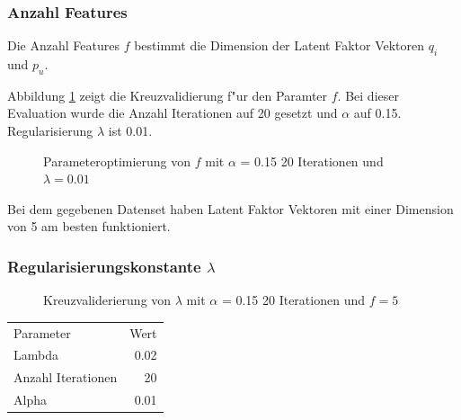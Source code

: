 \documentclass[a4paper, 12pt]{article}
\begin{document}
\subsubsection{Anzahl Features}

Die Anzahl Features $f$ bestimmt die Dimension der Latent Faktor Vektoren $q_i$ und $p_u$.

Abbildung \ref{fig:lambda1} zeigt die Kreuzvalidierung f"ur den Paramter $f$. Bei dieser Evaluation wurde die Anzahl Iterationen auf 20 gesetzt und $\alpha$ auf 0.15. Regularisierung $\lambda$ ist 0.01.

\begin{figure}
  \centering
{}
\label{fig:lambda1}
\caption{Parameteroptimierung von $f$ mit $\alpha$ = 0.15 20 Iterationen und $\lambda=0.01$}
\end{figure}

Bei dem gegebenen Datenset haben Latent Faktor Vektoren mit einer Dimension von 5 am besten funktioniert.

\subsubsection{Regularisierungskonstante $\lambda$}

\begin{figure}
  \centering
{}
\label{fig:lambda}
\caption{Kreuzvaliderierung von $\lambda$ mit $\alpha$ = 0.15 20 Iterationen und $f = 5$}
\end{figure}



\begin{center}
\begin{tabular}{lr}
 Parameter           &  Wert  \\
 Lambda              &  0.02  \\
 Anzahl Iterationen  &    20  \\
 Alpha               &  0.01  \\
\end{tabular}
\end{center}
\end{document}
